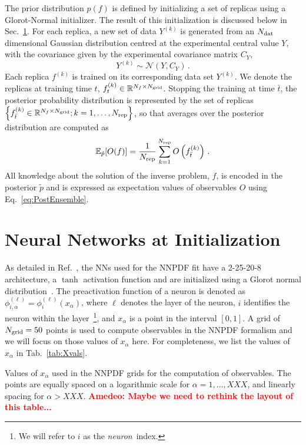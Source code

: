 \documentclass[11pt]{article}
\newcommand{\ac}[1]{\textcolor{red}{\textbf{Amedeo: #1}}}
\begin{document}
The prior distribution $p(f)$ is defined by initializing a set of replicas using a Glorot-Normal initializer.
The result of this initialization is discussed below in Sec.~\ref{sec:Init}.
For each replica, a new set of data $Y^{(k)}$ is generated from an $N_{\mathrm{dat}}$ dimensional Gaussian distribution
centred at the experimental central value $Y$, with the covariance given by the experimental covariance
matrix $C_Y$,
\begin{equation}
    \label{eq:ExpReplicaDistr}
    Y^{(k)} \sim \mathcal{N}\left(Y, C_Y\right)\, .
\end{equation}
Each replica $f^{(k)}$ is trained on its corresponding data set $Y^{(k)}$. We denote the replicas at training time $t$,
$f^{(k)}_{t} \in \mathbb{R}^{N_{f}\times N_{\mathrm{grid}}}$. Stopping the training at time $\bar{t}$, the posterior probability
distribution is represented by the set of replicas
$\left\{f^{(k)}_{\bar{t}}\in \mathbb{R}^{N_{f}\times N_{\mathrm{grid}}}; k=1, \ldots, N_{\rm rep}\right\}$, so that averages over the posterior
distribution are computed as
\begin{equation}
    \label{eq:PostEnsemble}
    \mathbb{E}_{\tilde{p}}[O(f)] = \frac{1}{N_{\rm rep}} \sum_{k=1}^{N_{\rm rep}}
        O\left(f^{(k)}_{\bar{t}}\right)\, .
\end{equation}
All knowledge about the solution of the inverse problem, $f$, is encoded in the posterior
$\tilde{p}$ and is expressed as expectation values of observables $O$ using
Eq.~\eqref{eq:PostEnsemble}.

\section{Neural Networks at Initialization}
\label{sec:Init}

As detailed in Ref.~\cite{NNPDF:2021njg}, the NNs used for the NNPDF fit have a 2-25-20-8 architecture,
a $\tanh$ activation function
and are initialized using a Glorot normal distribution~\cite{glorot2010understanding}. The preactivation
function of a neuron is denoted as $\phi^{(\ell)}_{i,\alpha} = \phi^{(\ell)}_i(x_\alpha)$, where $\ell$
denotes the layer of the neuron, $i$ identifies the neuron within the layer~\footnote{We will refer
to $i$ as the {\em neuron}\ index.}, and $x_{\alpha}$ is a point in the interval $[0,1]$.
A grid of $N_{\mathrm{grid}}=50$ points is used to compute observables in the NNPDF formalism and we will focus
on those values of $x_\alpha$ here. For completeness, we list the values of $x_\alpha$ in
Tab.~\ref{tab:Xvals}.

\begin{table}[ht]
    \centering
    
    \caption{Values of $x_\alpha$ used in the NNPDF grids for the computation of
    observables. The points are equally spaced on a logarithmic scale
    for $\alpha = 1, \ldots, XXX$, and linearly spacing for $\alpha > XXX$.
    \ac{Maybe we need to rethink the layout of this table...}
    \label{tab:Xvals}}
\end{table}
\end{document}
